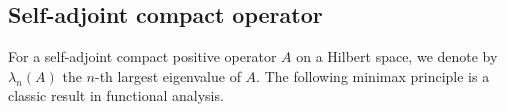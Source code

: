 

\subsection{Self-adjoint compact operator}
%

For a self-adjoint compact positive operator $A$ on a Hilbert space,
we denote by $\lambda_n(A)$ the $n$-th largest eigenvalue of $A$.
The following minimax principle is a classic result in functional analysis.

